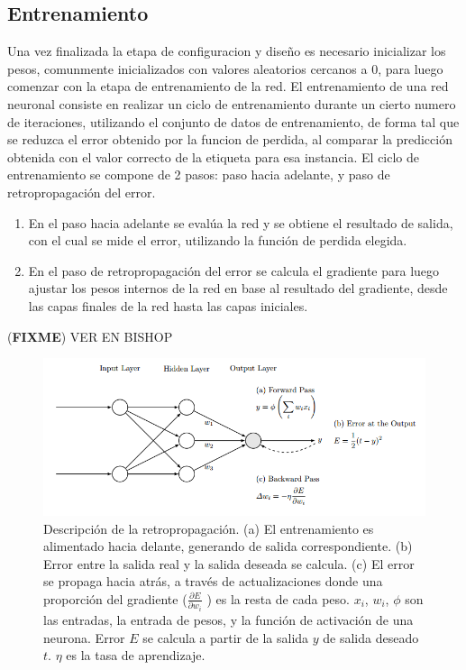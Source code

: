 \documentclass[a4paper,11pt,spanish]{book}
\newcommand*{\FIXME}[1]{{(\textbf{FIXME}) {#1}}}
\begin{document}
      \subsection {Entrenamiento}
	Una vez finalizada la etapa de configuracion y diseño es necesario inicializar los pesos, comunmente inicializados con valores aleatorios cercanos a 0, para luego comenzar con la etapa
	de entrenamiento de la red.
	El entrenamiento de una red neuronal consiste en realizar un ciclo de entrenamiento durante un cierto numero de iteraciones, utilizando el conjunto de datos de entrenamiento,
	de forma tal que se reduzca el error obtenido por la funcion de perdida, al comparar la predicción obtenida con el valor correcto de la etiqueta para esa instancia.
	El ciclo de entrenamiento se compone de 2 pasos: paso hacia adelante, y paso de retropropagación del error.
	\begin{enumerate}
	  \item En el paso hacia adelante se evalúa la red y se obtiene el resultado de salida, con el cual se mide el error, utilizando la función de perdida elegida.
	  \item En el paso de retropropagación del error se calcula el gradiente para luego ajustar los pesos internos de la red en base al resultado del gradiente, 
	    desde las capas finales de la red hasta las capas iniciales.
	\end{enumerate}
	\FIXME{VER EN BISHOP}
	\begin{figure}[H]
	  \begin{center}
	  \includegraphics[width=\linewidth]{./img/backprop.png}
	  \end{center}
	  \caption{ Descripción de la retropropagación. (a) El entrenamiento es alimentado hacia delante, generando de salida correspondiente. (b) Error entre la salida real y la salida deseada
	  se calcula. (c) El error se propaga hacia atrás, a través de actualizaciones donde una proporción del gradiente ($ \frac{\partial E}{\partial w_i}$ ) es la resta de cada peso. $x_i$, $w_i$, $\phi$ son las entradas,
	  la entrada de pesos, y la función de activación de una neurona. Error $E$ se calcula a partir de la salida $y$ de salida deseado $t$. $\eta$ es la tasa de aprendizaje.
	  \cite{Automatic_differentiation_ML} }
	  \label{fig:backprop}
	\end{figure}
\end{document}

